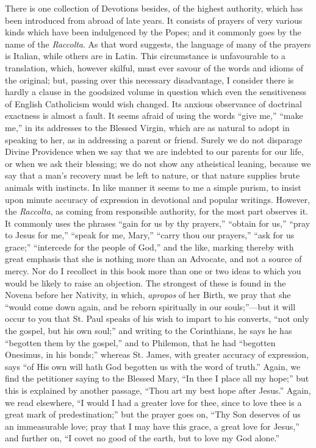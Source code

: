 There is one collection of Devotions besides, of the highest
authority, which has been introduced from abroad of late years. It
consists of prayers of very various kinds which have been indulgenced by
the Popes; and it commonly goes by the name of the \emph{Raccolta}. As
that word suggests, the language of many of the prayers is Italian,
while others are in Latin. This circumstance is unfavourable to a
translation, which, however skilful, must ever savour of the words and idioms of the original; but, passing over this necessary
disadvantage, I consider there is hardly a clause in the goodsized
volume in question which even the sensitiveness of English Catholicism
would wish changed. Its anxious observance of doctrinal exactness is
almost a fault. It seems afraid of using the words ``give me,''
``make me,'' in its addresses to the Blessed Virgin, which are
as natural to adopt in speaking to her, as in addressing a parent or
friend. Surely we do not disparage Divine Providence when we say that we
are indebted to our parents for our life, or when we ask their blessing;
we do not show any atheistical leaning, because we say that a man's
recovery must be left to nature, or that nature supplies brute animals
with instincts. In like manner it seems to me a simple purism, to insist
upon minute accuracy of expression in devotional and popular writings.
However, the \emph{Raccolta}, as coming from responsible authority, for
the most part observes it. It commonly uses the phrases ``gain for
us by thy prayers,'' ``obtain for us,'' ``pray to Jesus
for me,'' ``speak for me, Mary,'' ``carry thou our
prayers,'' ``ask for us grace;'' ``intercede for the
people of God,'' and the like, marking thereby with great emphasis
that she is nothing more than an Advocate, and not a source of mercy.
Nor do I recollect in this book more than one or two ideas to which you
would be likely to raise an objection. The strongest of these is found
in the Novena before her Nativity, in which, \emph{apropos} of her
Birth, we pray that she ``would come down again, and be reborn
spiritually in our souls;''—but it will occur to you that St. Paul
speaks of his wish to impart to his converts, ``not only the
gospel, but his own soul;'' and writing to the Corinthians, he says
he has ``begotten them by the gospel,'' and to Philemon, that he
had ``begotten Onesimus, in his bonds;'' whereas St. James, with
greater accuracy of expression, says ``of His own will hath God
begotten us with the word of truth.'' Again, we find the petitioner
saying to the Blessed Mary, ``In thee I place all my hope;'' but
this is explained by another passage, ``Thou art my best hope after
Jesus.'' Again, we read elsewhere, ``I would I had a greater
love for thee, since to love thee is a great mark of
predestination;'' but the prayer goes on, ``Thy Son deserves of
us an immeasurable love; pray that I may have this grace, a great love
for Jesus,'' and further on, ``I covet no good of the earth, but
to love my God alone.''

